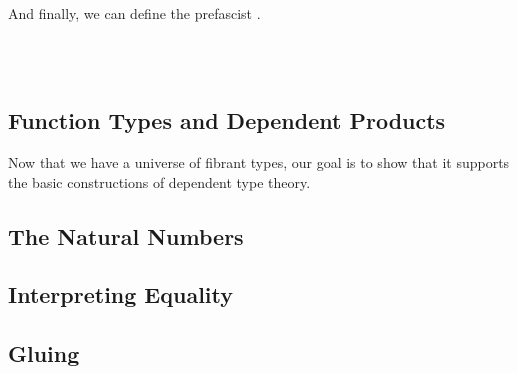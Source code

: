 And finally, we can define the prefascist .
% 
\begin{code}
\>[0]~\AgdaSymbol{:}~\<%
\\
\>[0]~%
\AgdaSymbol{=}~\AgdaSymbol{\{}~~\AgdaSymbol{=}~~\AgdaSymbol{;}~%
~\AgdaSymbol{=}~~\AgdaSymbol{\}}\<%
\end{code}

\subsection{Function Types and Dependent Products}

Now that we have a universe of fibrant types, our goal is to show that it
supports the basic constructions of dependent type theory.
% 

\subsection{The Natural Numbers}

\subsection{Interpreting Equality}

\subsection{Gluing}